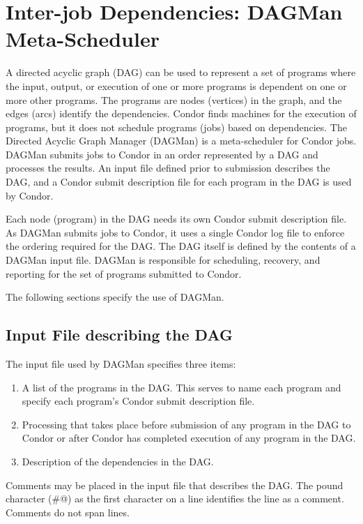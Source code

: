 \section{\label{sec:DAGMan}Inter-job Dependencies: DAGMan Meta-Scheduler}

A directed acyclic graph (DAG) can be used to represent a set of programs
where the input, output, or execution of one or more programs
is dependent on one or more other programs.
The programs are nodes (vertices) in the graph,
and the edges (arcs) identify the dependencies.
Condor finds machines for the execution of programs, but it
does not schedule programs (jobs) based on dependencies.
The Directed Acyclic Graph Manager (DAGMan) is a meta-scheduler for Condor
jobs. 
DAGMan submits jobs to Condor in an order represented by
a DAG and processes the results.
An input file defined prior to submission describes the DAG, and
a Condor submit description file for each program in the DAG
is used by Condor.

Each node (program) in the DAG needs its own Condor submit description file.
As DAGMan submits jobs to Condor, it uses a single Condor log file
to enforce the ordering required for the DAG.
The DAG itself is defined by the contents of a DAGMan input file.
DAGMan is responsible for scheduling, recovery, and reporting
for the set of programs submitted to Condor.

The following sections specify the use of DAGMan.

\subsection{Input File describing the DAG}

The input file used by DAGMan specifies three items:
\begin{enumerate}
\item
A list of the programs in the DAG. This serves to name each program
and specify each program's Condor submit description file.
\item
Processing that takes place before submission of
any program in the DAG to Condor or after Condor has completed execution
of any program in the DAG.
\item
Description of the dependencies in the DAG.
\end{enumerate}

Comments may be placed in the input file that describes the DAG.
The pound character (\verb@#@) as the first character on a
line identifies the line as a comment.
Comments do not span lines.

